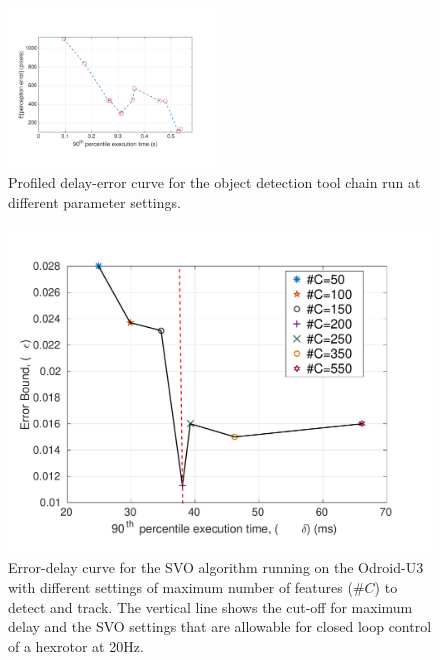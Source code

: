 \begin{figure}[t]
	\centering
	\includegraphics[trim = 0 30mm 0 30mm, width=0.49\textwidth]{figures/chainErrorDelay}
	\caption{Profiled delay-error curve for the object detection tool chain run at different parameter settings.}
	\label{fig:eps_delta_toy}
	\vspace{-10pt}
\end{figure}



\begin{figure}[htb]
\centering
\includegraphics[width=0.99\columnwidth]{figures/errVsTime}
\vspace{-20pt}
\caption{Error-delay curve for the SVO algorithm running on the Odroid-U3 with different settings of maximum number of features ($\#C$) to detect and track. The vertical line shows the cut-off for maximum delay and the SVO settings that are allowable for closed loop control of a hexrotor at 20Hz.}
\label{fig:svo_error_delay}
\vspace{-20pt}
\end{figure}


